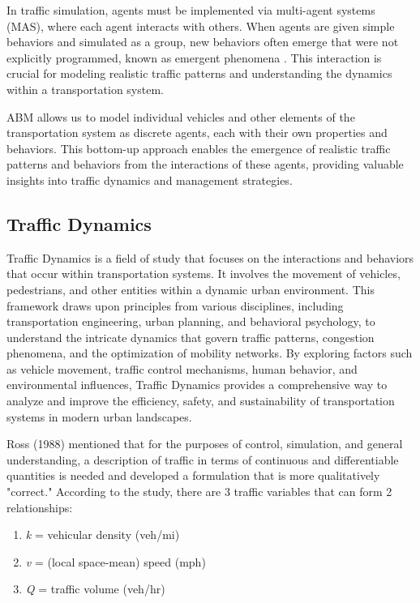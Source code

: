 In traffic simulation, agents must be implemented via multi-agent systems (MAS), where each agent interacts with others. When agents are given simple behaviors and simulated as a group, new behaviors often emerge that were not explicitly programmed, known as emergent phenomena \cite{Lindsey2002}. This interaction is crucial for modeling realistic traffic patterns and understanding the dynamics within a transportation system.

ABM allows us to model individual vehicles and other elements of the transportation system as discrete agents, each with their own properties and behaviors. This bottom-up approach enables the emergence of realistic traffic patterns and behaviors from the interactions of these agents, providing valuable insights into traffic dynamics and management strategies.

\subsection{Traffic Dynamics}
Traffic Dynamics is a field of study that focuses on the interactions and behaviors that occur within transportation systems. It involves the movement of vehicles, pedestrians, and other entities within a dynamic urban environment. This framework draws upon principles from various disciplines, including transportation engineering, urban planning, and behavioral psychology, to understand the intricate dynamics that govern traffic patterns, congestion phenomena, and the optimization of mobility networks. By exploring factors such as vehicle movement, traffic control mechanisms, human behavior, and environmental influences, Traffic Dynamics provides a comprehensive way to analyze and improve the efficiency, safety, and sustainability of transportation systems in modern urban landscapes.

Ross (1988) mentioned that for the purposes of control, simulation, and general understanding, a description of traffic in terms of continuous and differentiable quantities is needed and developed a formulation that is more qualitatively "correct." According to the study, there are 3 traffic variables that can form 2 relationships:

\begin{enumerate}
    \item \textit{k} = vehicular density (veh/mi)
    \item \textit{v} = (local space-mean) speed (mph)
    \item \textit{Q} = traffic volume (veh/hr)
\end{enumerate}


